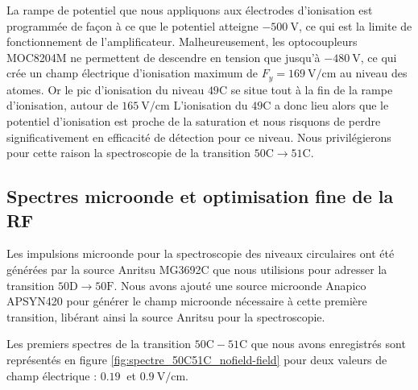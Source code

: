 La rampe de potentiel que nous appliquons aux électrodes d'ionisation est programmée de façon à ce que le potentiel atteigne $\SI{-500}{\V}$, ce qui est la limite de fonctionnement de l'amplificateur.
Malheureusement, les optocoupleurs MOC8204M ne permettent de descendre en tension que jusqu'à $\SI{-480}{\V}$, ce qui crée un champ électrique d'ionisation maximum de $F_y = \SI{169}{\V/\cm}$ au niveau des atomes.
Or le pic d'ionisation du niveau $\mathrm{49C}$ se situe tout à la fin de la rampe d'ionisation, autour de $\SI{165}{\V/\cm}$
L'ionisation du $\mathrm{49C}$ a donc lieu alors que le potentiel d'ionisation est proche de la saturation et nous risquons de perdre significativement en efficacité de détection pour ce niveau.
Nous privilégierons pour cette raison la spectroscopie de la transition $\mathrm{50C \rightarrow 51C}$.

\clearpage
	\subsection{Spectres microonde et optimisation fine de la RF}

\noindent Les impulsions microonde pour la spectroscopie des niveaux circulaires ont été générées par la source Anritsu MG3692C que nous utilisions pour adresser la transition $\mathrm{50D \rightarrow 50F}$.
Nous avons ajouté une source microonde Anapico APSYN420 pour générer le champ microonde nécessaire à cette première transition, libérant ainsi la source Anritsu pour la spectroscopie.

Les premiers spectres de la transition $\mathrm{50C-51C}$ que nous avons enregistrés sont représentés en figure \eqref{fig:spectre_50C51C_nofield-field} pour deux valeurs de champ électrique : $\SI{0.19}{}$ et $\SI{0.9}{\V/\cm}$.


